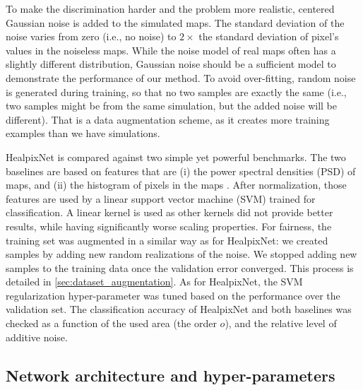 \documentclass[final,twocolumn,3p,times,sort&compress]{elsarticle}
\newcommand{\1}{\b{1}}              %
\newcommand{\0}{\b{0}}              %
\begin{document}

To make the discrimination harder and the problem more realistic, centered Gaussian noise is added to the simulated maps.
The standard deviation of the noise varies from zero (i.e., no noise) to $2\times$ the standard deviation of pixel's values in the noiseless maps.
While the noise model of real maps often has a slightly different distribution, Gaussian noise should be a sufficient model to demonstrate the performance of our method.
To avoid over-fitting, random noise is generated during training, so that no two samples are exactly the same (i.e., two samples might be from the same simulation, but the added noise will be different).
That is a data augmentation scheme, as it creates more training examples than we have simulations.

HealpixNet is compared against two simple yet powerful benchmarks.
The two baselines are based on features that are (i) the power spectral densities (PSD) of maps, and (ii) the histogram of pixels in the maps \citep{patton2017cosmologicalconstraints}.
After normalization, those features are used by a linear support vector machine (SVM) trained for classification.
A linear kernel is used as other kernels did not provide better results, while having significantly worse scaling properties.
For fairness, the training set was augmented in a similar way as for HealpixNet: we created samples by adding new random realizations of the noise. We stopped adding new samples to the training data once the validation error converged. This process is detailed in \ref{sec:dataset_augmentation}.
As for HealpixNet, the SVM regularization hyper-parameter was tuned based on the performance over the validation set.
The classification accuracy of HealpixNet and both baselines was checked as a function of the used area (the order $o$), and the relative level of additive noise.

\subsection{Network architecture and hyper-parameters}
\end{document}
